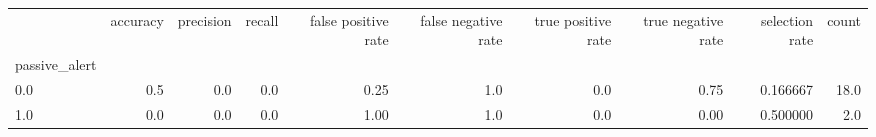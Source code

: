 \begin{tabular}{lrrrrrrrrr}
\toprule
{} &  accuracy &  precision &  recall &  false positive rate &  false negative rate &  true positive rate &  true negative rate &  selection rate &  count \\
passive\_alert &           &            &         &                      &                      &                     &                     &                 &        \\
\midrule
0.0           &       0.5 &        0.0 &     0.0 &                 0.25 &                  1.0 &                 0.0 &                0.75 &        0.166667 &   18.0 \\
1.0           &       0.0 &        0.0 &     0.0 &                 1.00 &                  1.0 &                 0.0 &                0.00 &        0.500000 &    2.0 \\
\bottomrule
\end{tabular}
